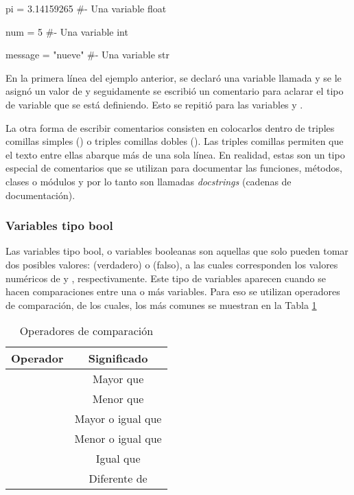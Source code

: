 \begin{pyin}
pi = 3.14159265     #- Una variable float

num = 5             #- Una variable int
    
message = "nueve"   #- Una variable str
\end{pyin} 

En la primera línea del ejemplo anterior, se declaró una variable llamada  y se le asignó un valor de  y seguidamente se escribió un comentario para aclarar el tipo de variable que se está definiendo. Esto se repitió para las variables  y . 

La otra forma de escribir comentarios consisten en colocarlos dentro de triples comillas simples () o triples comillas dobles (). Las triples comillas permiten que el texto entre ellas abarque más de una sola línea. En realidad, estas son un tipo especial de comentarios que se utilizan para documentar las funciones, métodos, clases o módulos y por lo tanto son llamadas \emph{docstrings} (cadenas de documentación). 

\subsubsection{Variables tipo bool}
Las variables tipo bool, o variables booleanas son aquellas que solo pueden tomar dos posibles valores:  (verdadero) o  (falso), a las cuales corresponden los valores numéricos de  y , respectivamente. Este tipo de variables aparecen cuando se hacen comparaciones entre una o más variables. Para eso se utilizan operadores de comparación, de los cuales, los más comunes se muestran en la Tabla \ref{tab:comparison-operators}

\begin{table}[htb]
    \centering
    \caption{Operadores de comparación}
    \label{tab:comparison-operators}

    \begin{tabular}{c c} \hline
        Operador & Significado \\ \hline
        \pynorm{>} & Mayor que \\
        \pynorm{<} & Menor que \\
        \pynorm{>=} & Mayor o igual que \\
        \pynorm{<=} & Menor o igual que \\
        \pynorm{==} & Igual que \\
        \pynorm{!=} & Diferente de \\ \hline        
    \end{tabular}
\end{table}

